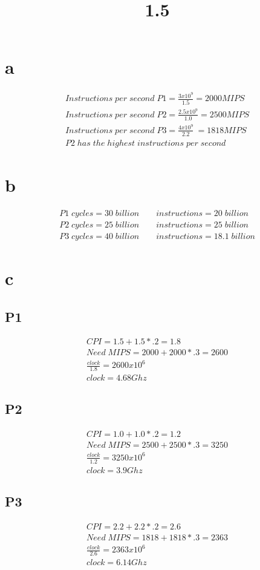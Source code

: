 \documentclass[12pt,letterpaper]{amsart}
\title{1.5}
\begin{document}
 
\maketitle

\section*{a}
\begin{align*}
Instructions\;per\;second\;P1 = \frac{3x10^9}{1.5} = 2000MIPS\\
Instructions\;per\;second\;P2 = \frac{2.5x10^9}{1.0} = 2500MIPS\\
Instructions\;per\;second\;P3 = \frac{4x10^9}{2.2} ~= 1818MIPS\\
P2\;has\;the\;highest\;instructions\;per\;second
\end{align*}

\section*{b}
\begin{align*}
P1\;cycles = 30\;billion\qquad instructions = 20\;billion\\
P2\;cycles = 25\;billion\qquad instructions = 25\;billion\\
P3\;cycles = 40\;billion\qquad instructions = 18.1\;billion
\end{align*}

\section*{c}
\subsection{P1}
\begin{align*}
CPI = 1.5+1.5*.2 = 1.8\\
Need\;MIPS = 2000+2000*.3=2600\\
\frac{clock}{1.8}=2600x10^6\\
clock=4.68Ghz
\end{align*}
\subsection{P2}
\begin{align*}
CPI = 1.0+1.0*.2 = 1.2\\
Need\;MIPS = 2500+2500*.3=3250\\
\frac{clock}{1.2}=3250x10^6\\
clock=3.9Ghz
\end{align*}
\subsection{P3}
\begin{align*}
CPI = 2.2+2.2*.2 = 2.6\\
Need\;MIPS = 1818+1818*.3=2363\\
\frac{clock}{2.6}=2363x10^6\\
clock=6.14Ghz
\end{align*}
\end{document}
